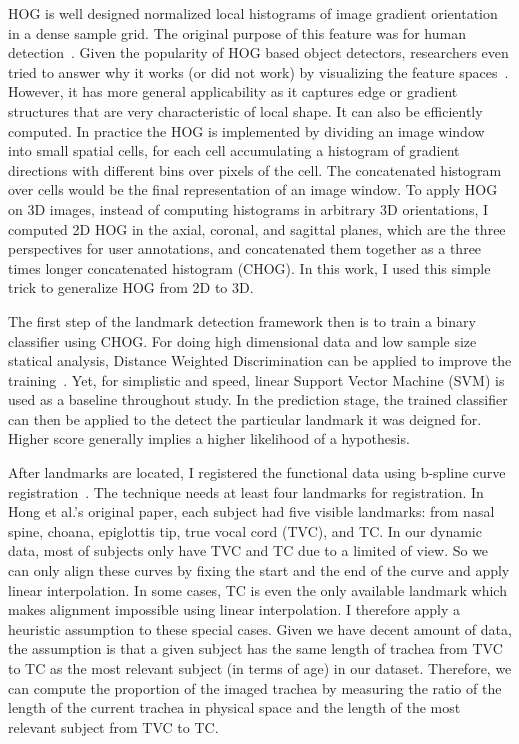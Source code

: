 HOG is well designed normalized local histograms of image gradient orientation in a dense sample grid.
The original purpose of this feature was for human detection~\cite{dalal2005histograms}.
Given the popularity of HOG based object detectors, researchers even tried to answer why it works (or did not work) by visualizing the feature spaces~\cite{vondrick2013hoggles}.
However, it has more general applicability as it captures edge or gradient structures that are very characteristic of local shape. 
It can also be efficiently computed.
In practice the HOG is implemented by dividing an image window into small spatial cells, for each cell accumulating a histogram of gradient directions with different bins over pixels of the cell.
The concatenated histogram over cells would be the final representation of an image window. 
To apply HOG on 3D images, instead of computing histograms in arbitrary 3D orientations, I computed 2D HOG in the axial, coronal, and sagittal planes, which are the three perspectives for user annotations, and concatenated them together as a three times longer concatenated histogram (CHOG).
In this work, I used this simple trick to generalize HOG from 2D to 3D.

The first step of the landmark detection framework then is to train a binary classifier using CHOG.
For doing high dimensional data and low sample size statical analysis, Distance Weighted Discrimination can be applied to improve the training~\cite{marron2007distance}.
Yet, for simplistic and speed, linear Support Vector Machine (SVM) is used as a baseline throughout study.
In the prediction stage, the trained classifier can then be applied to the detect the particular landmark it was deigned for.
Higher score generally implies a higher likelihood of a hypothesis.

After landmarks are located, I registered the functional data using b-spline curve registration~\cite{ramsay2006functional}.
The technique needs at least four landmarks for registration.
In Hong et al.'s original paper, each subject had five visible landmarks: from nasal spine, choana, epiglottis tip, true vocal cord (TVC), and TC.
In our dynamic data, most of subjects only have TVC and TC due to a limited of view.
So we can only align these curves by fixing the start and the end of the curve and apply linear interpolation.
In some cases, TC is even the only available landmark which makes alignment impossible using linear interpolation.
I therefore apply a heuristic assumption to these special cases.
Given we have decent amount of data,
the assumption is that a given subject has the same length of trachea from TVC to TC as the most relevant subject (in terms of age) in our dataset.
Therefore, we can compute the proportion of the imaged trachea by measuring the ratio of the length of the current trachea in physical space and the length of the most relevant subject from TVC to TC.

